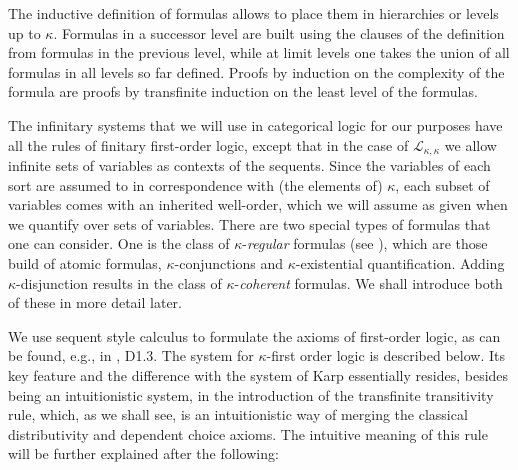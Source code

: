 \documentclass[a4paper,11pt]{article}
\theoremstyle{plain}
\theoremstyle{plain}
\theoremstyle{remark}
\begin{document}
The inductive definition of formulas allows to place them in hierarchies or levels up to $\kappa$. Formulas in a successor level are built using the clauses of the definition from formulas in the previous level, while at limit levels one takes the union of all formulas in all levels so far defined. Proofs by induction on the complexity of the formula are proofs by transfinite induction on the least level of the formulas.

The infinitary systems that we will use in categorical logic for our purposes have all the rules of finitary first-order logic, except that in the case of $\mathcal{L}_{\kappa, \kappa}$ we allow infinite sets of variables as contexts of the sequents. Since the variables of each sort are assumed to in correspondence with (the elements of) $\kappa$, each subset of variables comes with an inherited well-order, which we will assume as given when we quantify over sets of variables. There are two special types of formulas that one can consider. One is the class of $\kappa$-\emph{regular} formulas (see \cite{makkai}), which are those build of atomic formulas, $\kappa$-conjunctions and $\kappa$-existential quantification. Adding $\kappa$-disjunction  results in the class of $\kappa$-\emph{coherent} formulas. We shall introduce both of these in more detail later. 

We use sequent style calculus to formulate the axioms of first-order logic, as can be found, e.g., in \cite{johnstone}, D1.3. The system for $\kappa$-first order logic is described below. Its key feature and the difference with the system of Karp essentially resides, besides being an intuitionistic system, in the introduction of the transfinite transitivity rule, which, as we shall see, is an intuitionistic way of merging the classical distributivity and dependent choice axioms. The intuitive meaning of this rule will be further explained after the following:
\end{document}
